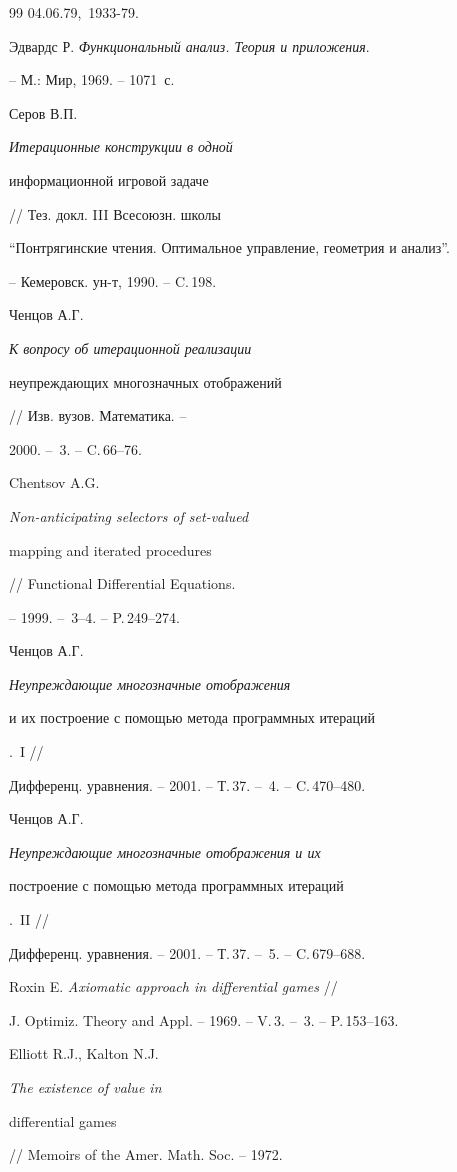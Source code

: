 \begin{thebibliography}{99}
04.06.79, \No\,1933-79.




Эдвардс Р. {\em Функциональный анализ. Теория и приложения}.


-- М.: Мир, 1969. -- 1071~с.




Серов В.П. {\em Итерационные конструкции в одной


информационной игровой задаче} // Тез. докл. III Всесоюзн. школы


``Понтрягинские чтения. Оптимальное управление, геометрия и анализ''.


-- Кемеровск. ун-т, 1990. -- C.\,198.




Ченцов А.Г. {\em К вопросу об итерационной реализации


неупреждающих многозначных отображений} // Изв. вузов. Математика. --


2000. -- \No\,3. -- C.\,66--76.




Chentsov A.G. {\em Non-anticipating selectors of set-valued


mapping and iterated procedures} // Functional Differential Equations.


-- 1999. -- \No\,3--4. -- P.\,249--274.




Ченцов А.Г. {\em  Неупреждающие многозначные отображения


и их построение с помощью метода программных итераций}.~I //


Дифференц. уравнения. -- 2001. -- Т.\,37. -- \No\,4. -- C.\,470--480.




Ченцов А.Г. {\em Неупреждающие многозначные отображения и их


построение с помощью метода программных итераций}.~II //


Дифференц. уравнения. -- 2001. -- Т.\,37. -- \No\,5. -- C.\,679--688.




Roxin E. {\em Axiomatic approach in differential games} //


J. Optimiz. Theory and Appl. -- 1969. -- V.\,3. -- \No\,3. -- P.\,153--163.




Elliott R.J., Kalton N.J. {\em The existence of value in


differential games} // Memoirs of the Amer. Math. Soc. -- 1972.



\end{thebibliography}

